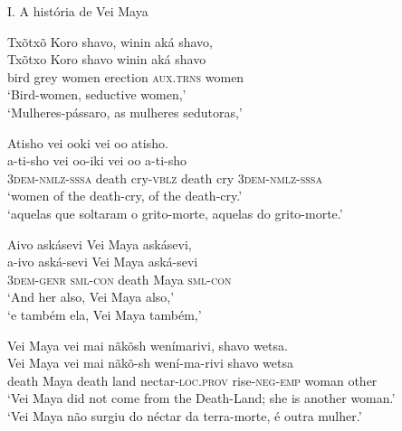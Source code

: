 \documentclass[output=paper,
modfonts,nonflat
]{langsci/langscibook}
\begin{document}
\noindent
I. A história de Vei Maya%


\ea Txõtxõ Koro shavo, winin aká shavo, \\[.3em]
\gll Txõtxo Koro shavo winin    aká               shavo \\
     bird   grey women erection \textsc{aux.trns} women \\
\glt `Bird-women, seductive women,' \\
`Mulheres-pássaro, as mulheres sedutoras,' \\
\z

\ea Atisho vei ooki vei oo atisho. \\[.3em]
\gll a-ti-sho                vei   oo-iki            vei   oo  a-ti-sho                \\
     3\textsc{dem-nmlz-sssa} death cry-\textsc{vblz} death cry 3\textsc{dem-nmlz-sssa} \\
\glt `women of the death-cry, of the death-cry.' \\
`aquelas que soltaram o grito-morte, aquelas do grito-morte.' \\
\z

\ea Aivo askásevi Vei Maya askásevi, \\[.3em]
\gll a-ivo              aská-sevi        Vei   Maya aská-sevi        \\
     3\textsc{dem-genr} \textsc{sml-con} death Maya \textsc{sml-con} \\
\glt `And her also, Vei Maya also,' \\
`e também ela, Vei Maya também,' \\
\z

\ea Vei Maya vei mai nãkõsh wenímarivi, shavo wetsa. \\[.3em]
\gll Vei   Maya vei   mai  nãkõ-sh                  wení-ma-rivi          shavo wetsa \\
     death Maya death land nectar-\textsc{loc.prov} rise-\textsc{neg-emp} woman other \\
\glt `Vei Maya did not come from the Death-Land; she is another woman.' \\
`Vei Maya não surgiu do néctar da terra-morte, é outra mulher.' \\
\z

\end{document}
